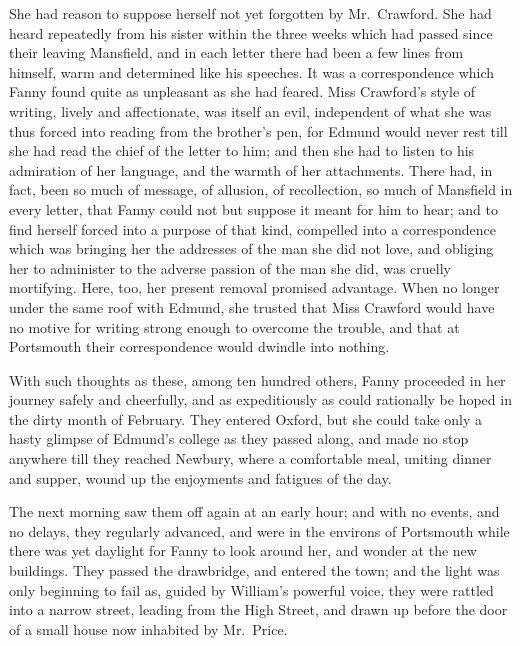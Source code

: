 \documentclass{article}
\begin{document}
She had reason to suppose herself not yet forgotten by
Mr.\ Crawford.  She had heard repeatedly from his sister within
the three weeks which had passed since their leaving Mansfield,
and in each letter there had been a few lines from himself,
warm and determined like his speeches.  It was a correspondence
which Fanny found quite as unpleasant as she had feared.
Miss Crawford's style of writing, lively and affectionate,
was itself an evil, independent of what she was thus
forced into reading from the brother's pen, for Edmund
would never rest till she had read the chief of the letter
to him; and then she had to listen to his admiration
of her language, and the warmth of her attachments.
There had, in fact, been so much of message, of allusion,
of recollection, so much of Mansfield in every letter,
that Fanny could not but suppose it meant for him to hear;
and to find herself forced into a purpose of that kind,
compelled into a correspondence which was bringing her
the addresses of the man she did not love, and obliging
her to administer to the adverse passion of the man she did,
was cruelly mortifying.  Here, too, her present removal
promised advantage.  When no longer under the same roof
with Edmund, she trusted that Miss Crawford would have no
motive for writing strong enough to overcome the trouble,
and that at Portsmouth their correspondence would dwindle
into nothing.

With such thoughts as these, among ten hundred others,
Fanny proceeded in her journey safely and cheerfully,
and as expeditiously as could rationally be hoped
in the dirty month of February.  They entered Oxford,
but she could take only a hasty glimpse of Edmund's
college as they passed along, and made no stop anywhere
till they reached Newbury, where a comfortable meal,
uniting dinner and supper, wound up the enjoyments and
fatigues of the day.

The next morning saw them off again at an early hour;
and with no events, and no delays, they regularly advanced,
and were in the environs of Portsmouth while there was yet
daylight for Fanny to look around her, and wonder at the
new buildings.  They passed the drawbridge, and entered
the town; and the light was only beginning to fail as,
guided by William's powerful voice, they were rattled
into a narrow street, leading from the High Street,
and drawn up before the door of a small house now inhabited
by Mr.\ Price.
\end{document}
